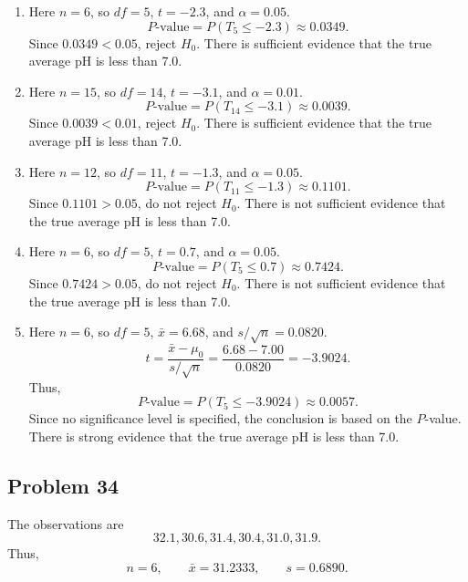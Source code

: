 \documentclass[11pt]{article}
\begin{document}
\begin{enumerate}
\item[(a)] Here $n=6$, so $df=5$, $t=-2.3$, and $\alpha=0.05$.
\[
P\text{-value}=P(T_5\le -2.3)\approx 0.0349.
\]
Since $0.0349<0.05$, reject $H_0$. There is sufficient evidence that the true average pH is less than 7.0.

\item[(b)] Here $n=15$, so $df=14$, $t=-3.1$, and $\alpha=0.01$.
\[
P\text{-value}=P(T_{14}\le -3.1)\approx 0.0039.
\]
Since $0.0039<0.01$, reject $H_0$. There is sufficient evidence that the true average pH is less than 7.0.

\item[(c)] Here $n=12$, so $df=11$, $t=-1.3$, and $\alpha=0.05$.
\[
P\text{-value}=P(T_{11}\le -1.3)\approx 0.1101.
\]
Since $0.1101>0.05$, do not reject $H_0$. There is not sufficient evidence that the true average pH is less than 7.0.

\item[(d)] Here $n=6$, so $df=5$, $t=0.7$, and $\alpha=0.05$.
\[
P\text{-value}=P(T_5\le 0.7)\approx 0.7424.
\]
Since $0.7424>0.05$, do not reject $H_0$. There is not sufficient evidence that the true average pH is less than 7.0.

\item[(e)] Here $n=6$, so $df=5$, $\bar{x}=6.68$, and $s/\sqrt{n}=0.0820$.
\[
t=\frac{\bar{x}-\mu_0}{s/\sqrt{n}}
=\frac{6.68-7.00}{0.0820}
=-3.9024.
\]
Thus,
\[
P\text{-value}=P(T_5\le -3.9024)\approx 0.0057.
\]
Since no significance level is specified, the conclusion is based on the $P$-value. There is strong evidence that the true average pH is less than 7.0.
\end{enumerate}

\subsection*{Problem 34}

The observations are
\[
32.1,
30.6,
31.4,
30.4,
31.0,
31.9.
\]
Thus,
\[
n=6,
\qquad \bar{x}=31.2333,
\qquad s=0.6890.
\]
\end{document}
